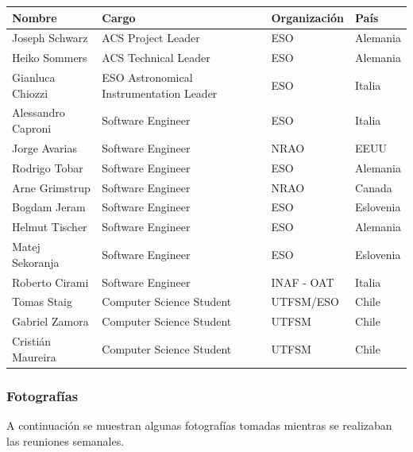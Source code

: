 \begin{tabular}{|l|l|l|l|}
	\hline
	{\bf Nombre} & {\bf Cargo} & {\bf Organización} & {\bf País} \\\hline
	Joseph Schwarz & ACS Project Leader & ESO & Alemania \\\hline
	Heiko Sommers & ACS Technical Leader & ESO & Alemania \\\hline
	Gianluca Chiozzi & ESO Astronomical Instrumentation Leader & ESO & Italia \\\hline
	Alessandro Caproni & Software Engineer& ESO & Italia \\\hline
	Jorge Avarias & Software Engineer & NRAO & EEUU \\\hline
	Rodrigo Tobar & Software Engineer & ESO & Alemania \\\hline
	Arne Grimstrup & Software Engineer & NRAO & Canada \\\hline
	Bogdam Jeram & Software Engineer & ESO & Eslovenia \\\hline
	Helmut Tischer & Software Engineer & ESO & Alemania \\\hline
	Matej Sekoranja & Software Engineer  & ESO & Eslovenia \\\hline
	Roberto Cirami & Software Engineer & INAF - OAT & Italia\\\hline
	Tomas Staig & Computer Science Student & UTFSM/ESO & Chile \\\hline
	Gabriel Zamora & Computer Science Student & UTFSM & Chile \\\hline
	Cristián Maureira & Computer Science Student & UTFSM & Chile \\\hline	
\end{tabular}

\subsubsection{Fotografías}
A continuación se muestran algunas fotografías tomadas mientras se realizaban las reuniones semanales.\\

